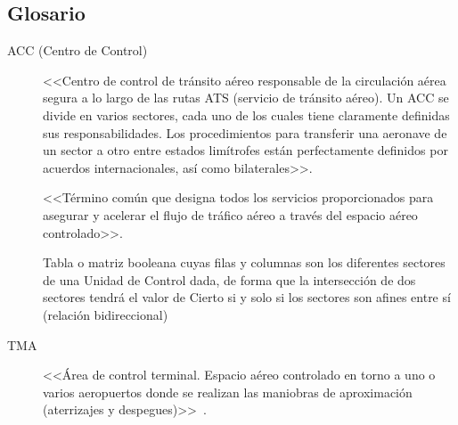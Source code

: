 \subsection{Glosario}
\label{sec:Definiciones}
\begin{description}
    \item[ACC (Centro de Control)] \label{ACC}
    <<Centro de control de tránsito aéreo responsable de la circulación aérea segura a lo largo de las rutas ATS (servicio de tránsito aéreo). Un ACC se divide en varios sectores, cada uno de los cuales tiene claramente definidas sus responsabilidades. Los procedimientos para transferir una aeronave de un sector a otro entre estados limítrofes están perfectamente definidos por acuerdos internacionales, así como bilaterales>>.~\cite{ENAIRE-web}

    \item [] <<Término común que designa todos los servicios proporcionados para asegurar y acelerar el flujo de tráfico aéreo a través del espacio aéreo controlado>>.~\cite{ENAIRE-web}
    
    \item[] Tabla o matriz booleana cuyas filas y columnas son los diferentes sectores de una Unidad de Control dada, de forma que la intersección de dos sectores tendrá el valor de Cierto si y solo si los sectores son afines entre sí (relación bidireccional)
    
    \item[TMA] \label{TMA} <<Área de control terminal. Espacio aéreo controlado en torno a uno o varios aeropuertos donde se realizan las maniobras de aproximación (aterrizajes y despegues)>>~\cite{ENAIRE-web}.
\end{description}